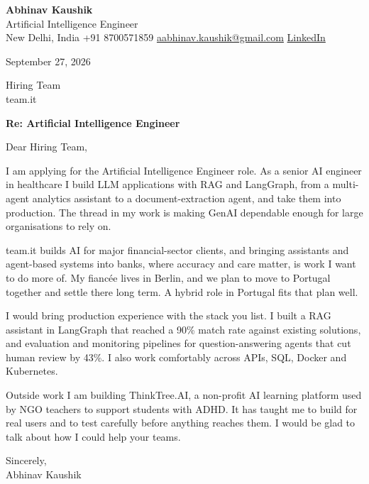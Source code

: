 \documentclass[11pt,a4paper]{article}
\begin{document}
{\Large\bfseries Abhinav Kaushik}\\
Artificial Intelligence Engineer\\
New Delhi, India \textbar{} +91 8700571859 \textbar{} \href{mailto:aabhinav.kaushik@gmail.com}{aabhinav.kaushik@gmail.com} \textbar{} \href{https://www.linkedin.com/in/abhinav-kaushik10/}{LinkedIn}  

September 27, 2026

Hiring Team\\
team.it

\textbf{Re: Artificial Intelligence Engineer}

Dear Hiring Team,

I am applying for the Artificial Intelligence Engineer role. As a senior AI engineer in healthcare I build LLM applications with RAG and LangGraph, from a multi-agent analytics assistant to a document-extraction agent, and take them into production. The thread in my work is making GenAI dependable enough for large organisations to rely on.

team.it builds AI for major financial-sector clients, and bringing assistants and agent-based systems into banks, where accuracy and care matter, is work I want to do more of. My fiancée lives in Berlin, and we plan to move to Portugal together and settle there long term. A hybrid role in Portugal fits that plan well.

I would bring production experience with the stack you list. I built a RAG assistant in LangGraph that reached a 90\% match rate against existing solutions, and evaluation and monitoring pipelines for question-answering agents that cut human review by 43\%. I also work comfortably across APIs, SQL, Docker and Kubernetes.

Outside work I am building ThinkTree.AI, a non-profit AI learning platform used by NGO teachers to support students with ADHD. It has taught me to build for real users and to test carefully before anything reaches them. I would be glad to talk about how I could help your teams.

Sincerely,\\[4pt]
Abhinav Kaushik
\end{document}
